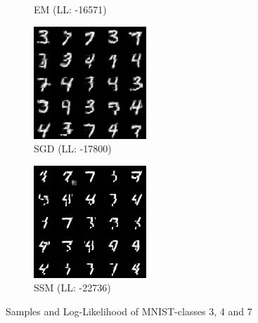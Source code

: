 \begin{figure}[H]
\begin{subfigure}[b]{0.24\textwidth}
        \caption{EM (LL: -16571)}
    \end{subfigure}
    \begin{subfigure}[b]{0.24\textwidth}
        \centering
        \includegraphics[width=\textwidth]{figures/einsum/mnist/[3, 4, 7]_SGD.png} 
        \caption{SGD (LL: -17800)}
    \end{subfigure}
    \begin{subfigure}[b]{0.24\textwidth}
        \centering
        \includegraphics[width=\textwidth]{figures/einsum/mnist/[3, 4, 7]_SSM.png}
        \caption{SSM (LL: -22736)}
    \end{subfigure}
    \caption{Samples and Log-Likelihood of MNIST-classes 3, 4 and 7}
    \label{fig:mnist7}
\end{figure}

